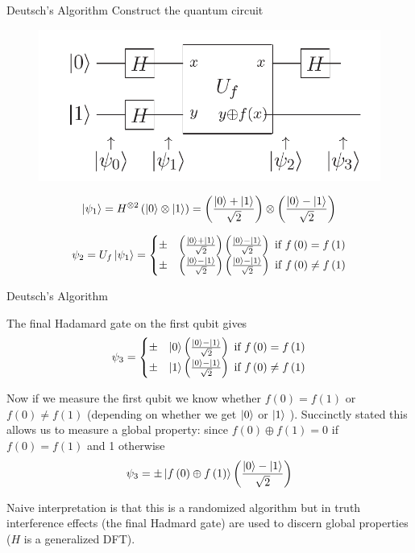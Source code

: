\documentclass{beamer}
\begin{document}
\begin{frame}{Deutsch's Algorithm}
Construct the quantum circuit
\begin{figure}[ht]
  \includegraphics[scale=0.33]{pasted1}
\end{figure}
\[
\Ket{\psi_{1}} = H^{\otimes2}\left(\Ket{0}\otimes\Ket{1}\right)= \left(\frac{\Ket{0}+\Ket{1}}{\sqrt{2}}\right)\otimes\left(\frac{\Ket{0}-\Ket{1}}{\sqrt{2}}\right)
\]

\[
\psi_{2}=U_{f}\Ket{\psi_{1}}=\begin{cases}
\pm & \left(\frac{\Ket{0}+\Ket{1}}{\sqrt{2}}\right)\left(\frac{\Ket{0}-\Ket{1}}{\sqrt{2}}\right)\text{ if }f\left(0\right)=f\left(1\right)\\
\pm & \left(\frac{\Ket{0}-\Ket{1}}{\sqrt{2}}\right)\left(\frac{\Ket{0}-\Ket{1}}{\sqrt{2}}\right)\text{ if }f\left(0\right)\neq f\left(1\right)
\end{cases}
\]

\end{frame}


\begin{frame}{Deutsch's Algorithm}

The final Hadamard gate on the first qubit gives
\[
\psi_{3}=\begin{cases}
\pm & \Ket{0}\left(\frac{\Ket{0}-\Ket{1}}{\sqrt{2}}\right)\text{ if }f\left(0\right)=f\left(1\right)\\
\pm & \Ket{1}\left(\frac{\Ket{0}-\Ket{1}}{\sqrt{2}}\right)\text{ if }f\left(0\right)\neq f\left(1\right)
\end{cases}
\]

Now if we measure the first qubit we know whether $f\left(0\right)=f\left(1\right)$
or $f\left(0\right)\neq f\left(1\right)$ (depending on whether we get $\Ket{0}$ or $\Ket{1}$ ). Succinctly stated this allows us to measure a global property: since $f\left(0\right)\oplus f\left(1\right)=0$ if $f\left(0\right)=f\left(1\right)$ and 1 otherwise
\[
\psi_{3}=\pm\Ket{f\left(0\right)\oplus f\left(1\right)}\left(\frac{\Ket{0}-\Ket{1}}{\sqrt{2}}\right)
\] 

Naive interpretation is that this is a randomized algorithm but in truth interference effects (the final Hadmard gate)
are used to discern global properties ($H$ is a generalized DFT).
 

\end{frame}
\end{document}
